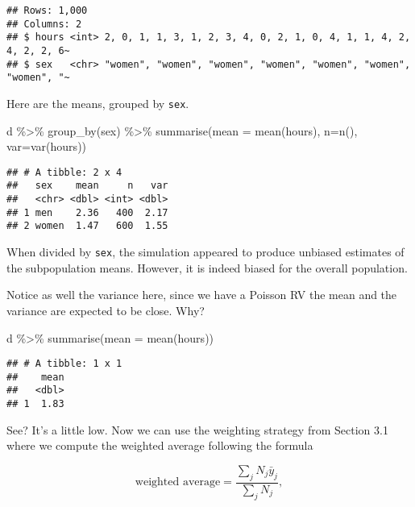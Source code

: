\documentclass[
]{article}
\newenvironment{Shaded}{\begin{snugshade}}{\end{snugshade}}
\newcommand{\AttributeTok}[1]{\textcolor[rgb]{0.77,0.63,0.00}{#1}}
\newcommand{\FunctionTok}[1]{\textcolor[rgb]{0.00,0.00,0.00}{#1}}
\newcommand{\NormalTok}[1]{#1}
\newcommand{\SpecialCharTok}[1]{\textcolor[rgb]{0.00,0.00,0.00}{#1}}
\begin{document}
\begin{verbatim}
## Rows: 1,000
## Columns: 2
## $ hours <int> 2, 0, 1, 1, 3, 1, 2, 3, 4, 0, 2, 1, 0, 4, 1, 1, 4, 2, 4, 2, 2, 6~
## $ sex   <chr> "women", "women", "women", "women", "women", "women", "women", "~
\end{verbatim}

Here are the means, grouped by \texttt{sex}.

\begin{Shaded}
\begin{Highlighting}[]
\NormalTok{d }\SpecialCharTok{\%\textgreater{}\%} 
  \FunctionTok{group\_by}\NormalTok{(sex) }\SpecialCharTok{\%\textgreater{}\%} 
  \FunctionTok{summarise}\NormalTok{(}\AttributeTok{mean =} \FunctionTok{mean}\NormalTok{(hours), }\AttributeTok{n=}\FunctionTok{n}\NormalTok{(), }\AttributeTok{var=}\FunctionTok{var}\NormalTok{(hours))}
\end{Highlighting}
\end{Shaded}

\begin{verbatim}
## # A tibble: 2 x 4
##   sex    mean     n   var
##   <chr> <dbl> <int> <dbl>
## 1 men    2.36   400  2.17
## 2 women  1.47   600  1.55
\end{verbatim}

When divided by \texttt{sex}, the simulation appeared to produce
unbiased estimates of the subpopulation means. However, it is indeed
biased for the overall population.

Notice as well the variance here, since we have a Poisson RV the mean
and the variance are expected to be close. Why?

\begin{Shaded}
\begin{Highlighting}[]
\NormalTok{d }\SpecialCharTok{\%\textgreater{}\%} 
  \FunctionTok{summarise}\NormalTok{(}\AttributeTok{mean =} \FunctionTok{mean}\NormalTok{(hours))}
\end{Highlighting}
\end{Shaded}

\begin{verbatim}
## # A tibble: 1 x 1
##    mean
##   <dbl>
## 1  1.83
\end{verbatim}

See? It's a little low. Now we can use the weighting strategy from
Section 3.1 where we compute the weighted average following the formula

\[\text{weighted average} = \frac{\sum_j N_j \bar y_j}{\sum_j N_j},\]
\end{document}
